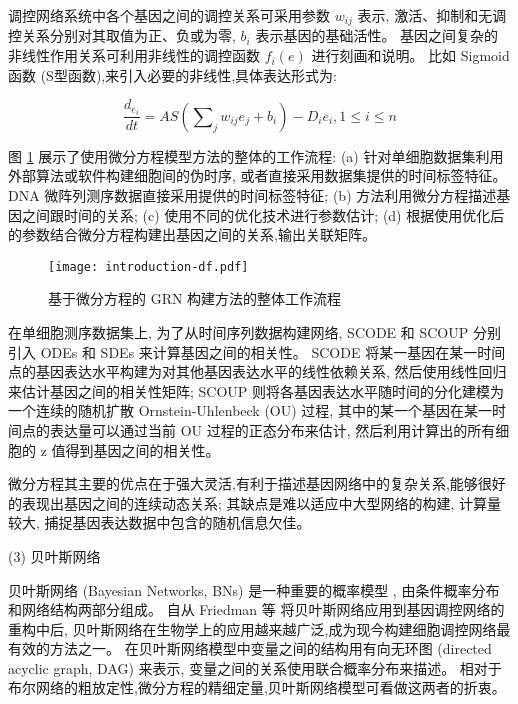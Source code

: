 调控网络系统中各个基因之间的调控关系可采用参数 $w_{ij}$ 表示,
激活、抑制和无调控关系分别对其取值为正、负或为零, $b_i$ 表示基因的基础活性。
基因之间复杂的非线性作用关系可利用非线性的调控函数 $f_i(e)$ 进行刻画和说明。
比如 Sigmoid 函数 (S型函数),来引入必要的非线性,具体表达形式为:

\begin{equation}
\frac{{d_{e_i } }}{{dt}} = AS(\sum\nolimits_j {w_{ij} e_j } + b_i) - D_i e_i ,1 \le i \le n
\end{equation}

图 \ref{fig:pre-df} 展示了使用微分方程模型方法的整体的工作流程: (a) 针对单细胞数据集利用外部算法或软件构建细胞间的伪时序, 或者直接采用数据集提供的时间标签特征。
DNA 微阵列测序数据直接采用提供的时间标签特征;
(b) 方法利用微分方程描述基因之间跟时间的关系;
(c) 使用不同的优化技术进行参数估计;
(d) 根据使用优化后的参数结合微分方程构建出基因之间的关系,输出关联矩阵。
\begin{figure}[!htbp]
    \centering
    \texttt{[image: introduction-df.pdf]}
    \caption{
        基于微分方程的 GRN 构建方法的整体工作流程
    }
    \label{fig:pre-df}
\end{figure}

在单细胞测序数据集上, 
为了从时间序列数据构建网络, SCODE  和 SCOUP  
分别引入 ODEs 和 SDEs 来计算基因之间的相关性。
SCODE 将某一基因在某一时间点的基因表达水平构建为对其他基因表达水平的线性依赖关系,
然后使用线性回归来估计基因之间的相关性矩阵;
SCOUP 则将各基因表达水平随时间的分化建模为一个连续的随机扩散 Ornstein-Uhlenbeck (OU) 过程,
其中的某一个基因在某一时间点的表达量可以通过当前 OU 过程的正态分布来估计,
然后利用计算出的所有细胞的 z 值得到基因之间的相关性。

微分方程其主要的优点在于强大灵活,有利于描述基因网络中的复杂关系,能够很好的表现出基因之间的连续动态关系;
其缺点是难以适应中大型网络的构建, 计算量较大, 捕捉基因表达数据中包含的随机信息欠佳。

(3) 贝叶斯网络

贝叶斯网络 (Bayesian Networks, BNs) 是一种重要的概率模型 ,
由条件概率分布和网络结构两部分组成。
自从 Friedman 等  将贝叶斯网络应用到基因调控网络的重构中后,
贝叶斯网络在生物学上的应用越来越广泛,成为现今构建细胞调控网络最有效的方法之一。
在贝叶斯网络模型中变量之间的结构用有向无环图 (directed acyclic graph, DAG) 来表示,
变量之间的关系使用联合概率分布来描述。
相对于布尔网络的粗放定性,微分方程的精细定量,贝叶斯网络模型可看做这两者的折衷。

